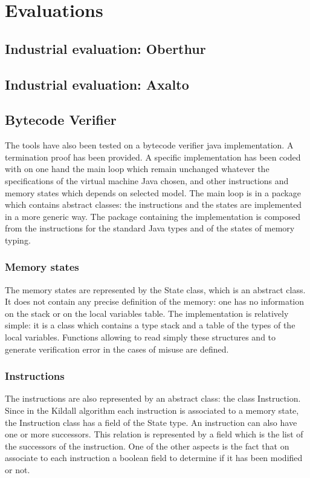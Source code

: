 \chapter{Evaluations}
\section{Industrial evaluation: Oberthur}
\section{Industrial evaluation: Axalto}
\section{Bytecode Verifier}
The tools have also been tested on a bytecode verifier java implementation. A termination proof has been provided.
A specific implementation has been coded with on one hand the main loop which remain unchanged whatever the specifications of the virtual machine Java chosen, and other instructions and memory states which depends on selected model.
The main loop is in a package which contains abstract classes: 
the instructions and the states are implemented in a more generic way.
The package containing the implementation is composed from the instructions for the standard Java types and of the states of memory typing. 
\subsection {Memory states}
The memory states are represented by the State class, which is an abstract class.  It does not contain any precise definition of the memory: 
one has no information on the stack or on the local variables table. 
The implementation is relatively simple: 
it is a class which contains a type stack and a table of the types of the local variables. 
Functions allowing to read simply these structures and to generate verification error in the cases of misuse are defined.   
\subsection{Instructions}
The instructions are also represented by an abstract class: 
the class Instruction.  
Since in the Kildall algorithm each instruction is associated to a memory state,  the Instruction class has a field of the State type. 
An instruction can also have one or more successors. 
This relation is represented by a field which is the list of the successors of the instruction.  
One of the other aspects is the fact that on associate to each instruction a boolean field to determine if it has been modified or not.

